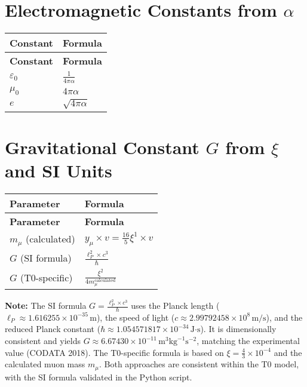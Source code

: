 \documentclass[12pt,a4paper]{article}
\begin{document}
	\section{Electromagnetic Constants from \(\alpha\)}
	
	\begin{longtable}{|p{3cm}|p{4cm}|}
		\hline
		\textbf{Constant} & \textbf{Formula} \\
		\hline
		\endfirsthead
		\hline
		\textbf{Constant} & \textbf{Formula} \\
		\hline
		\endhead
		\(\varepsilon_0\) & \(\frac{1}{4\pi\alpha}\) \\
		\hline
		\(\mu_0\) & \(4\pi\alpha\) \\
		\hline
		\(e\) & \(\sqrt{4\pi\alpha}\) \\
		\hline
	\end{longtable}
	
	\section{Gravitational Constant \(G\) from \(\xi\) and SI Units}
	
	\begin{longtable}{|p{3cm}|p{5cm}|}
		\hline
		\textbf{Parameter} & \textbf{Formula} \\
		\hline
		\endfirsthead
		\hline
		\textbf{Parameter} & \textbf{Formula} \\
		\hline
		\endhead
		\(m_{\mu}\) (calculated) & \(y_{\mu} \times v = \frac{16}{5}\xi^{1} \times v\) \\
		\hline
		\(G\) (SI formula) & \(\frac{\ell_P^2 \times c^3}{\hbar}\) \\
		\hline
		\(G\) (T0-specific) & \(\frac{\xi^{2}}{4m_{\mu}^{\text{calculated}}}\) \\
		\hline
	\end{longtable}
	
	\textbf{Note:} The SI formula \( G = \frac{\ell_P^2 \times c^3}{\hbar} \) uses the Planck length (\(\ell_P \approx 1.616255 \times 10^{-35} \, \text{m}\)), the speed of light (\(c \approx 2.99792458 \times 10^8 \, \text{m/s}\)), and the reduced Planck constant (\(\hbar \approx 1.054571817 \times 10^{-34} \, \text{J·s}\)). It is dimensionally consistent and yields \( G \approx 6.67430 \times 10^{-11} \, \text{m}^3 \text{kg}^{-1} \text{s}^{-2} \), matching the experimental value (CODATA 2018). The T0-specific formula is based on \(\xi = \frac{4}{3} \times 10^{-4}\) and the calculated muon mass \( m_\mu \). Both approaches are consistent within the T0 model, with the SI formula validated in the Python script.
	
\end{document}

